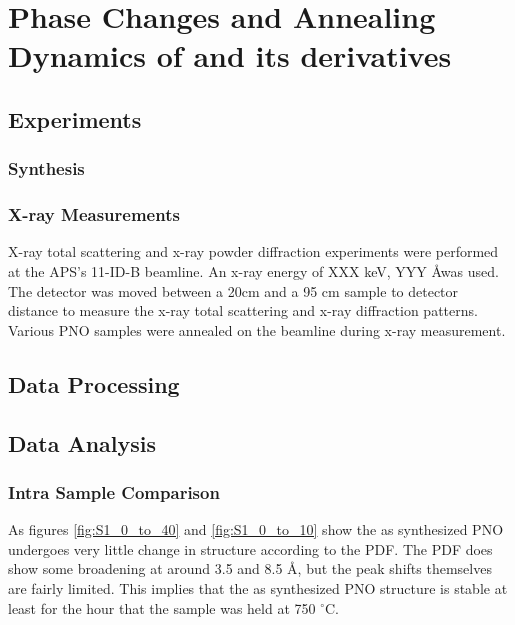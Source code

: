 \graphicspath{{./pno/figures/}}
\chapter{Phase Changes and Annealing Dynamics of  and its derivatives}
\section{Experiments}

\subsection{ Synthesis}

\subsection{X-ray Measurements}
X-ray total scattering and x-ray powder diffraction experiments were performed at the APS's 11-ID-B beamline.
An x-ray energy of XXX keV, YYY \AA was used.
The detector was moved between a 20cm and a 95 cm sample to detector distance to measure the x-ray total scattering and x-ray diffraction patterns.
Various PNO samples were annealed on the beamline during x-ray measurement.
\section{Data Processing}


\section{Data Analysis}

\subsection{Intra Sample Comparison}
As figures \ref{fig:S1_0_to_40} and \ref{fig:S1_0_to_10} show the as synthesized PNO undergoes very little change in structure according to the PDF.
The PDF does show some broadening at around 3.5 and 8.5 \AA, but the peak shifts themselves are fairly limited.
This implies that the as synthesized PNO structure is stable at least for the  hour that the sample was held at 750 $^\circ$C.


